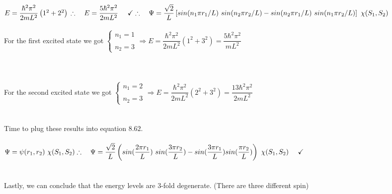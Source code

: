 \documentclass[fleqn]{article}
\begin{document}
\begin{enumerate}
{        \\
        $
          E=\dfrac{\hbar^2 \pi^2}{2m L^2} \left(1^2+2^2\right)
          \\
          \\
          \\
          \therefore ~~~ E=\dfrac{5 \hbar^2 \pi^2}{2m L^2}  ~~~~ \checkmark
          \\
          \\
          \\
          \therefore ~~~ \Psi=
          \dfrac{\sqrt{2}}{L} \left[
            sin(n_1 \pi r_1/L) ~ sin(n_2 \pi r_2/L)
            -sin(n_2 \pi r_1/L) ~ sin(n_1 \pi r_2/L)
          \right]
           ~ \chi(S_1, S_2)
        $
        \\
        \\
        For the first excited state we got $\begin{cases}
          n_1=1
          \\
          \\
          n_2=3
        \end{cases} \Longrightarrow E=\dfrac{\hbar^2 \pi^2}{2m L^2} \left(1^2+3^2\right)=\dfrac{5 \hbar^2 \pi^2}{m L^2}
        $
        \\
        \\
        \\
        \\
        For the second excited state we got $\begin{cases}
          n_1=2
          \\
          \\
          n_2=3
        \end{cases} \Longrightarrow E=\dfrac{\hbar^2 \pi^2}{2m L^2} \left(2^2+3^2\right)=\dfrac{13 \hbar^2 \pi^2}{2m L^2}
        $
        \\
        \\
        \\
        Time to plug these results into equation $8.62$.
        \\
        \\
        $
          \Psi=\psi(r_1, r_2) ~ \chi(S_1, S_2)
          \\
          \\
          \\
          \therefore ~~~ \Psi=\dfrac{\sqrt{2}}{L} \left(
            sin(\dfrac{2\pi r_1}{L}) ~ sin(\dfrac{3 \pi r_2}{L})
            -sin(\dfrac{3 \pi r_1}{L}) sin(\dfrac{\pi r_2}{L})
          \right) ~ \chi(S_1, S_2) ~~~~ \checkmark
        $
        \\
        \\
        \\
        Lastly, we can conclude that the energy levels are 3-fold degenerate. (There are three different spin)
        \\
      }
  
  \end{enumerate}
\end{document}
